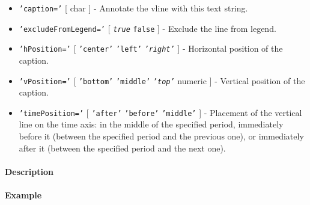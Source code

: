 \begin{itemize}
\item
  \texttt{'caption='} {[} char {]} - Annotate the vline with this text
  string.
\item
  \texttt{'excludeFromLegend='} {[} \emph{\texttt{true}} \textbar{}
  \texttt{false} {]} - Exclude the line from legend.
\item
  \texttt{'hPosition='} {[} \texttt{'center'} \textbar{} \texttt{'left'}
  \textbar{} \emph{\texttt{'right'}} {]} - Horizontal position of the
  caption.
\item
  \texttt{'vPosition='} {[} \texttt{'bottom'} \textbar{}
  \texttt{'middle'} \textbar{} \emph{\texttt{'top'}} \textbar{} numeric
  {]} - Vertical position of the caption.
\item
  \texttt{'timePosition='} {[} \texttt{'after'} \textbar{}
  \texttt{'before'} \textbar{} \texttt{'middle'} {]} - Placement of the
  vertical line on the time axis: in the middle of the specified period,
  immediately before it (between the specified period and the previous
  one), or immediately after it (between the specified period and the
  next one).
\end{itemize}

\paragraph{Description}\label{description}

\paragraph{Example}\label{example}


